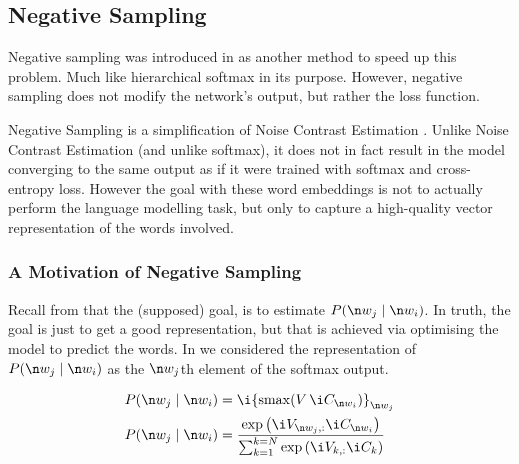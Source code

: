 {\subsection{Negative Sampling}\label{sec:negative-sampling}


Negative sampling was introduced in  as another method to speed up this problem.
Much like hierarchical softmax in its purpose.
However, negative sampling does not modify the network's output, but rather the loss function.


Negative Sampling is a simplification of Noise Contrast Estimation .
Unlike Noise Contrast Estimation (and unlike softmax), it does not in fact result in the model converging to the same output as if it were trained with softmax and cross-entropy loss.
However the goal with these word embeddings is not to actually perform the language modelling task, but only to capture a high-quality vector representation of the words involved.

\subsubsection{A Motivation of Negative Sampling}
Recall from  that the (supposed) goal, is to estimate $P(\n w_j\mid \n w_i)$.
In truth, the goal is just to get a good representation, but that is achieved via optimising the model to predict the words.
In    we considered the representation of $P(\n w_j\mid \n w_i)$ as the $\n w_j$th element of the softmax output.

\begin{align}
P(\n w_j \mid \n w_i) & = \i {\softmax(V\,\i C_{\n w_i})}_{\n w_j} \\
P(\n w_j \mid \n w_i) & = \frac{\exp{\i V_{\n w_j,:} \i C_{\n w_i}}}{\sum_{k=1}^{k=N} \exp{\i V_{k,:} \i C_{k}}}
\end{align}



}
